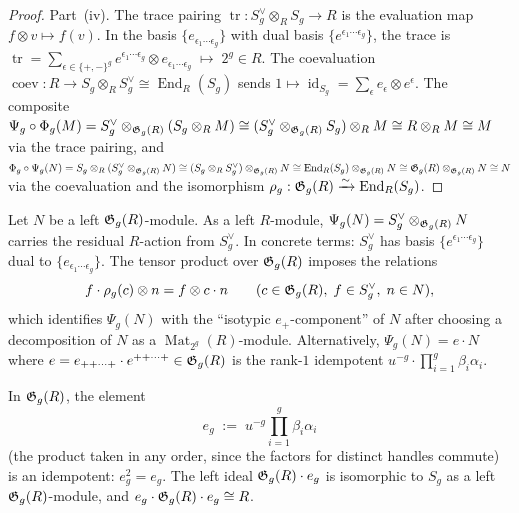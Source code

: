 \begin{proof}
Part~(iv).
The trace pairing $\operatorname{tr} : S_g^\vee \otimes_R S_g \to R$
is the evaluation map $f \otimes v \mapsto f(v)$.
In the basis $\{e_{\epsilon_1\cdots\epsilon_g}\}$
with dual basis $\{e^{\epsilon_1\cdots\epsilon_g}\}$,
the trace is
$\operatorname{tr} = \sum_{\epsilon \in \{+,-\}^g}
e^{\epsilon_1\cdots\epsilon_g} \otimes e_{\epsilon_1\cdots\epsilon_g}
\;\mapsto\; 2^g \in R$.
The coevaluation
$\operatorname{coev} : R \to S_g \otimes_R S_g^\vee
\cong \operatorname{End}_R(S_g)$
sends $1 \mapsto \operatorname{id}_{S_g}
= \sum_\epsilon e_\epsilon \otimes e^\epsilon$.
The composite $\Psi_g \circ \Phi_g(M)
= S_g^\vee \otimes_{\mathfrak{G}_g(R)} (S_g \otimes_R M)
\cong (S_g^\vee \otimes_{\mathfrak{G}_g(R)} S_g) \otimes_R M
\cong R \otimes_R M \cong M$
via the trace pairing,
and $\Phi_g \circ \Psi_g(N)
= S_g \otimes_R (S_g^\vee \otimes_{\mathfrak{G}_g(R)} N)
\cong (S_g \otimes_R S_g^\vee) \otimes_{\mathfrak{G}_g(R)} N
\cong \operatorname{End}_R(S_g) \otimes_{\mathfrak{G}_g(R)} N
\cong \mathfrak{G}_g(R) \otimes_{\mathfrak{G}_g(R)} N \cong N$
via the coevaluation and the isomorphism
$\rho_g : \mathfrak{G}_g(R) \xrightarrow{\sim} \operatorname{End}_R(S_g)$.
\end{proof}

\begin{remark}
Let $N$ be a left $\mathfrak{G}_g(R)$-module.
As a left $R$-module,
$\Psi_g(N) = S_g^\vee \otimes_{\mathfrak{G}_g(R)} N$
carries the residual $R$-action from $S_g^\vee$.
In concrete terms: $S_g^\vee$ has basis
$\{e^{\epsilon_1\cdots\epsilon_g}\}$ dual to
$\{e_{\epsilon_1\cdots\epsilon_g}\}$.
The tensor product over $\mathfrak{G}_g(R)$ imposes the relations
\[
f \cdot \rho_g(c) \otimes n = f \otimes c \cdot n
\qquad
(c \in \mathfrak{G}_g(R),\; f \in S_g^\vee,\; n \in N),
\]
which identifies $\Psi_g(N)$ with the ``isotypic $e_+$-component''
of $N$ after choosing a decomposition of $N$ as a
$\operatorname{Mat}_{2^g}(R)$-module.
Alternatively, $\Psi_g(N) = e \cdot N$ where
$e = e_{++\cdots+} \cdot e^{++\cdots+} \in \mathfrak{G}_g(R)$
is the rank-$1$ idempotent $u^{-g} \cdot \prod_{i=1}^g \beta_i\alpha_i$.
\end{remark}

\begin{corollary}
In $\mathfrak{G}_g(R)$, the element
\[
e_g \;:=\; u^{-g} \prod_{i=1}^g \beta_i\alpha_i
\]
(the product taken in any order, since the factors for
distinct handles commute) is an idempotent:
$e_g^2 = e_g$.
The left ideal $\mathfrak{G}_g(R) \cdot e_g$ is isomorphic to $S_g$
as a left $\mathfrak{G}_g(R)$-module, and $e_g \cdot \mathfrak{G}_g(R) \cdot e_g \cong R$.
\end{corollary}

